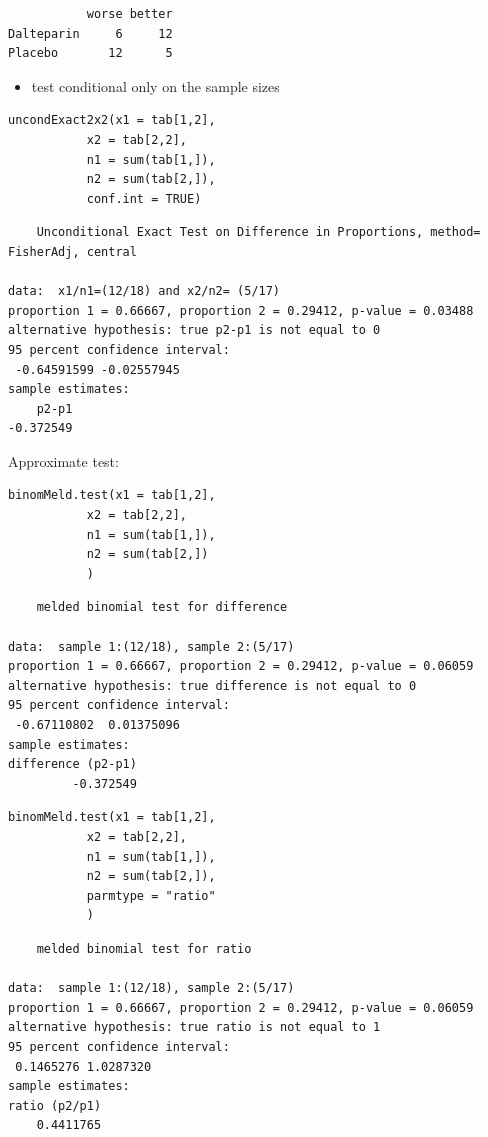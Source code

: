 \documentclass{article}
\begin{document}
\begin{verbatim}
           worse better
Dalteparin     6     12
Placebo       12      5
\end{verbatim}

\bigskip

\begin{itemize}
\item test conditional only on the sample sizes
\end{itemize}
\lstset{language=r,label= ,caption= ,captionpos=b,numbers=none}
\begin{lstlisting}
uncondExact2x2(x1 = tab[1,2],
	       x2 = tab[2,2],
	       n1 = sum(tab[1,]),
	       n2 = sum(tab[2,]),
	       conf.int = TRUE)
\end{lstlisting}

\begin{verbatim}
	Unconditional Exact Test on Difference in Proportions, method= FisherAdj, central

data:  x1/n1=(12/18) and x2/n2= (5/17)
proportion 1 = 0.66667, proportion 2 = 0.29412, p-value = 0.03488
alternative hypothesis: true p2-p1 is not equal to 0
95 percent confidence interval:
 -0.64591599 -0.02557945
sample estimates:
    p2-p1 
-0.372549
\end{verbatim}

Approximate test:
\lstset{language=r,label= ,caption= ,captionpos=b,numbers=none}
\begin{lstlisting}
binomMeld.test(x1 = tab[1,2],
	       x2 = tab[2,2],
	       n1 = sum(tab[1,]),
	       n2 = sum(tab[2,])
	       )
\end{lstlisting}

\begin{verbatim}
	melded binomial test for difference

data:  sample 1:(12/18), sample 2:(5/17)
proportion 1 = 0.66667, proportion 2 = 0.29412, p-value = 0.06059
alternative hypothesis: true difference is not equal to 0
95 percent confidence interval:
 -0.67110802  0.01375096
sample estimates:
difference (p2-p1) 
         -0.372549
\end{verbatim}

\lstset{language=r,label= ,caption= ,captionpos=b,numbers=none}
\begin{lstlisting}
binomMeld.test(x1 = tab[1,2],
	       x2 = tab[2,2],
	       n1 = sum(tab[1,]),
	       n2 = sum(tab[2,]),
	       parmtype = "ratio"
	       )
\end{lstlisting}

\begin{verbatim}
	melded binomial test for ratio

data:  sample 1:(12/18), sample 2:(5/17)
proportion 1 = 0.66667, proportion 2 = 0.29412, p-value = 0.06059
alternative hypothesis: true ratio is not equal to 1
95 percent confidence interval:
 0.1465276 1.0287320
sample estimates:
ratio (p2/p1) 
    0.4411765
\end{verbatim}
\end{document}
